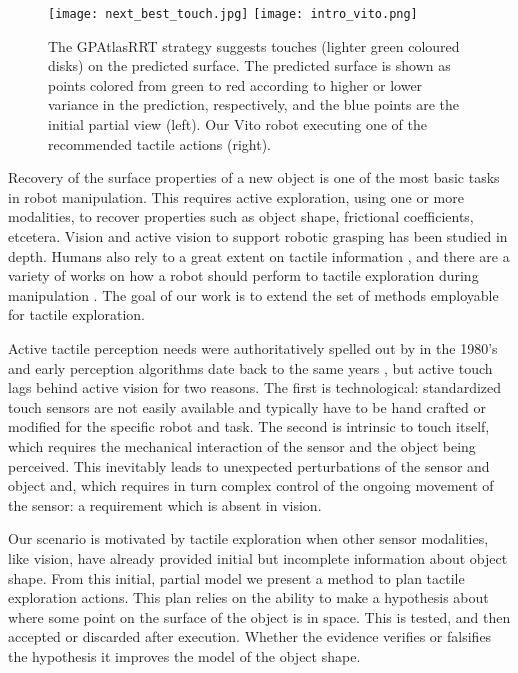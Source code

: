 \begin{figure*}
\centering
  \texttt{[image: next\_best\_touch.jpg]}
  \texttt{[image: intro\_vito.png]}
\caption{The GPAtlasRRT strategy suggests touches (lighter green coloured disks) on the predicted surface. The predicted surface is shown as points colored from green to red according to higher or lower variance in the prediction, respectively, and the blue points are the initial partial view (left). Our Vito robot executing one of the recommended tactile actions (right). }
\label{fig:setup_solution}
\end{figure*}

Recovery of the surface properties of a new object is one of the most basic tasks in robot manipulation. This requires active exploration, using one or more modalities, to recover properties such as object shape, frictional coefficients, etcetera. Vision and active vision to support robotic grasping \citep{Kragic2002TechRep,nunez2013models,arruda16,kopicki2015ijrr,kootstra2012a} has been studied in depth. Humans also rely to a great extent on tactile information \citep{johansson92}, and there are a variety of works on how a robot should perform to tactile exploration during manipulation \citep{zito2013sequential,jentoft2014a,Bjorkman2013Enhancing,Hebert2013Next,Petrovskaya2011Global}. The goal of our work is to extend the set of methods employable for tactile exploration.

Active tactile perception needs were authoritatively spelled out by \cite{Bajcsy1988Active} in the 1980's and early perception algorithms date back to the same years \citep{Grimson1984JRR,Faugeras1983IJCAI,Shekhar1986ICRA,Bajcsy1989Machine}, but active touch lags behind active vision for two reasons. The first is technological: standardized touch sensors are not easily available and typically have to be hand crafted or modified for the specific robot and task. The second is intrinsic to touch itself, which requires the mechanical interaction of the sensor and the object being perceived. This inevitably leads to unexpected perturbations of the sensor and object and, which requires in turn complex control of the ongoing movement of the sensor: a requirement which is absent in vision.

Our scenario is motivated by tactile exploration when other sensor modalities, like vision, have already provided initial but incomplete information about object shape. From this initial, partial model we present a method to plan tactile exploration actions. This plan relies on the ability to make a hypothesis about where some point on the surface of the object is in space. This is tested, and then accepted or discarded after execution. Whether the evidence verifies or falsifies the hypothesis it improves the model of the object shape.

